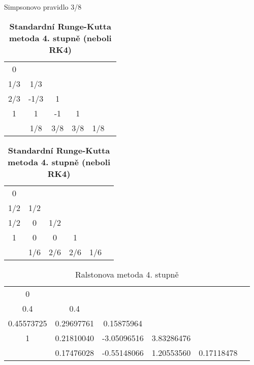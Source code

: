 \begin{table}[H]
    \parbox{.45\linewidth}{
        \centering
        \caption[Butcherova tabulka Simpsonova pravidla 3/8]{Simpsonovo pravidlo 3/8}
        \begin{tabular}{c | c c c c c}
            0   &                        \\
            1/3 & 1/3                    \\
            2/3 & -1/3 & 1               \\
            1   & 1    & -1  & 1         \\
            \hline
                & 1/8  & 3/8 & 3/8 & 1/8 \\
        \end{tabular}
    }
    \hfill
    \parbox{.45\linewidth}{
        \centering
        \caption[Butcherova tabulka RK4]{\textbf{Standardní Runge-Kutta metoda 4. stupně (neboli RK4)}}
        \begin{tabular}{c | c c c c c}
            0   &                       \\
            1/2 & 1/2                   \\
            1/2 & 0   & 1/2             \\
            1   & 0   & 0   & 1         \\
            \hline
                & 1/6 & 2/6 & 2/6 & 1/6 \\
        \end{tabular}
    }
\end{table}

\begin{table}[H]
    \hfill
    \parbox{.8\linewidth}{
        \centering
        \caption[Butcherova tabulka Ralstonovy metody 4. stupně]{Ralstonova metoda 4. stupně}
        \begin{tabular}{c | c c c c c}
            0          &                                                    \\
            0.4        & 0.4                                                \\
            0.45573725 & 0.29697761 & 0.15875964                            \\
            1          & 0.21810040 & -3.05096516 & 3.83286476              \\
            \hline
                       & 0.17476028 & -0.55148066 & 1.20553560 & 0.17118478 \\
        \end{tabular}
    }
    \hfill
\end{table}

